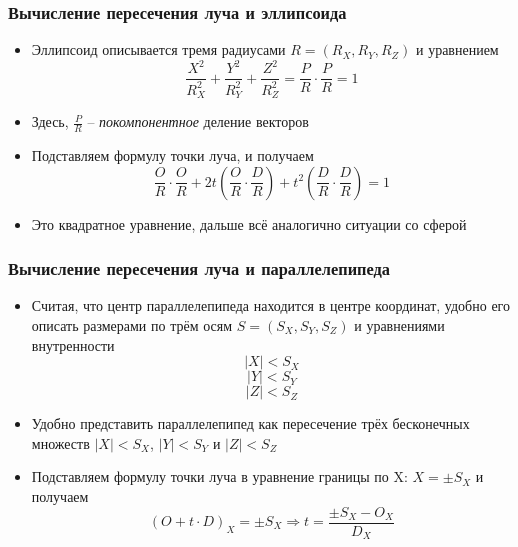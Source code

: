 \documentclass[10pt]{beamer}
\begin{document}
\begin{frame}
\frametitle{Вычисление пересечения луча и эллипсоида}
\begin{itemize}
\item Эллипсоид описывается тремя радиусами \begin{math}R=(R_X, R_Y, R_Z)\end{math} и уравнением
\begin{equation}
\frac{X^2}{R_X^2} + \frac{Y^2}{R_Y^2} + \frac{Z^2}{R_Z^2} = \frac{P}{R}\cdot \frac{P}{R} = 1
\end{equation}
\pause
\item Здесь, \begin{math}\frac{P}{R}\end{math} -- \textit{покомпонентное} деление векторов
\pause
\item Подставляем формулу точки луча, и получаем
\begin{equation}
\frac{O}{R}\cdot \frac{O}{R} + 2t \left(\frac{O}{R}\cdot \frac{D}{R}\right) + t^2 \left(\frac{D}{R}\cdot \frac{D}{R}\right) = 1
\end{equation}
\pause
\item Это квадратное уравнение, дальше всё аналогично ситуации со сферой
\end{itemize}
\end{frame}

\begin{frame}
\frametitle{Вычисление пересечения луча и параллелепипеда}
\begin{itemize}
\item Считая, что центр параллелепипеда находится в центре координат, удобно его описать размерами по трём осям \begin{math}S=(S_X, S_Y, S_Z)\end{math} и уравнениями внутренности
\begin{equation}
|X| < S_X
\end{equation}
\begin{equation}
|Y| < S_Y
\end{equation}
\begin{equation}
|Z| < S_Z
\end{equation}
\pause
\item Удобно представить параллелепипед как пересечение трёх бесконечных множеств \begin{math}|X| < S_X\end{math}, \begin{math}|Y| < S_Y\end{math} и \begin{math}|Z| < S_Z\end{math}
\pause
\item Подставляем формулу точки луча в уравнение границы по X: \begin{math}X = \pm S_X\end{math} и получаем
\begin{equation}
(O+t\cdot D)_X = \pm S_X \Longrightarrow t = \frac{\pm S_X - O_X}{D_X}
\end{equation}
\end{itemize}
\end{frame}
\end{document}
